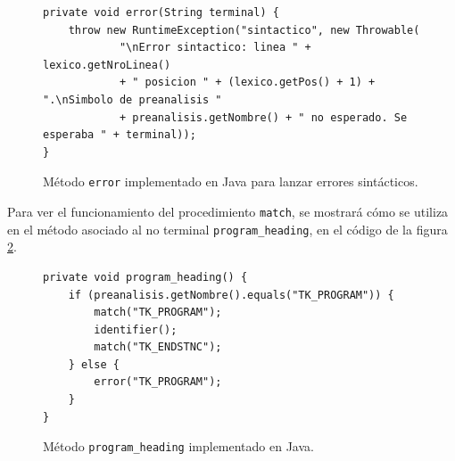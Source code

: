 \begin{figure}[H]
\begin{verbatim}
private void error(String terminal) {
	throw new RuntimeException("sintactico", new Throwable(
			"\nError sintactico: linea " + lexico.getNroLinea()
			+ " posicion " + (lexico.getPos() + 1) + ".\nSimbolo de preanalisis "
			+ preanalisis.getNombre() + " no esperado. Se esperaba " + terminal));
}
\end{verbatim}
\caption{Método \texttt{error} implementado en Java para lanzar errores sintácticos.}
\label{fig:metodo_error}
\end{figure}


Para ver el funcionamiento del procedimiento \texttt{match}, se mostrará cómo se utiliza en el método asociado al no terminal \texttt{program\_heading}, en el código de la figura \ref{fig:metodo_program_heading}.

\begin{figure}[H]
\begin{verbatim}
private void program_heading() {
	if (preanalisis.getNombre().equals("TK_PROGRAM")) {
		match("TK_PROGRAM");
		identifier();
		match("TK_ENDSTNC");
	} else {
		error("TK_PROGRAM");
	}
}
\end{verbatim}
\caption{Método \texttt{program\_heading} implementado en Java.}
\label{fig:metodo_program_heading}
\end{figure}


